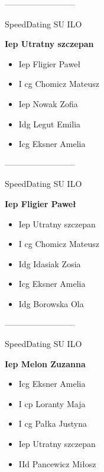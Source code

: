\documentclass[a4paper,10pt]{article}
\begin{document}
\begin{multicols}{3}
\begin{minipage}[l]{\textwidth}
\begin{itemize}
    \end{itemize}



\end{minipage}



\begin{minipage}[l]{\textwidth}
--------------------------

  \footnotesize{SpeedDating SU ILO}

  \bfseries{Iep Utratny szczepan}

  \begin{itemize}
    \item Iep Fligier Paweł
    \item I cg Chomicz Mateusz
    \item Iep Nowak Zofia
    \item Idg Legut Emilia
    \item Icg Eksner Amelia

    \end{itemize}



\end{minipage}



\begin{minipage}[l]{\textwidth}
--------------------------

  \footnotesize{SpeedDating SU ILO}

  \bfseries{Iep Fligier Paweł}

  \begin{itemize}
    \item Iep Utratny szczepan
    \item I cg Chomicz Mateusz
    \item Idg Idasiak Zosia
    \item Icg Eksner Amelia
    \item Idg Borowska Ola

    \end{itemize}



\end{minipage}



\begin{minipage}[l]{\textwidth}
--------------------------

  \footnotesize{SpeedDating SU ILO}

  \bfseries{Iep Melon Zuzanna}

  \begin{itemize}
    \item Icg Eksner Amelia
    \item I cp Loranty Maja
    \item I cg Pałka Justyna
    \item Iep Utratny szczepan
    \item IId Pancewicz Miłosz


\end{itemize}
\end{minipage}
\end{multicols}
\end{document}
